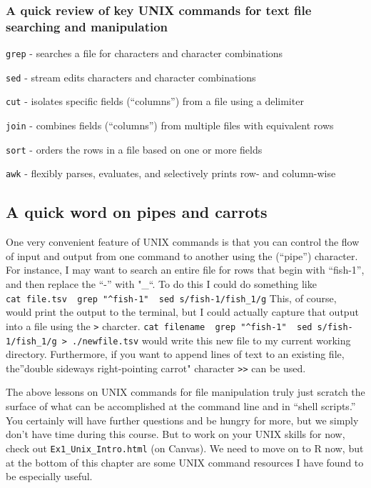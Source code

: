 \documentclass[]{book}
\begin{document}
\hypertarget{a-quick-review-of-key-unix-commands-for-text-file-searching-and-manipulation}{%
\subsubsection{A quick review of key UNIX commands for text file searching and manipulation}\label{a-quick-review-of-key-unix-commands-for-text-file-searching-and-manipulation}}

\texttt{grep} - searches a file for characters and character combinations

\texttt{sed} - stream edits characters and character combinations

\texttt{cut} - isolates specific fields (``columns'') from a file using a delimiter

\texttt{join} - combines fields (``columns'') from multiple files with equivalent rows

\texttt{sort} - orders the rows in a file based on one or more fields

\texttt{awk} - flexibly parses, evaluates, and selectively prints row- and column-wise

\hypertarget{a-quick-word-on-pipes-and-carrots}{%
\subsection{A quick word on pipes and carrots}\label{a-quick-word-on-pipes-and-carrots}}

One very convenient feature of UNIX commands is that you can control the flow of input and output from one command to another using the \texttt{\textbar{}} (``pipe'') character. For instance, I may want to search an entire file for rows that begin with ``fish-1'', and then replace the ``-'' with "\_``. To do this I could do something like \texttt{cat\ file.tsv\ \textbar{}\ grep\ "\^{}fish-1"\ \textbar{}\ sed\ \textquotesingle{}s/fish-1/fish\_1/g\textquotesingle{}} This, of course, would print the output to the terminal, but I could actually capture that output into a file using the \texttt{\textgreater{}} charcter. \texttt{cat\ filename\ \textbar{}\ grep\ "\^{}fish-1"\ \textbar{}\ sed\ \textquotesingle{}s/fish-1/fish\_1/g\textquotesingle{}\ \textgreater{}\ ./newfile.tsv} would write this new file to my current working directory. Furthermore, if you want to append lines of text to an existing file, the''double sideways right-pointing carrot" character \texttt{\textgreater{}\textgreater{}} can be used.

The above lessons on UNIX commands for file manipulation truly just scratch the surface of what can be accomplished at the command line and in ``shell scripts.'' You certainly will have further questions and be hungry for more, but we simply don't have time during this course. But to work on your UNIX skills for now, check out \texttt{Ex1\_Unix\_Intro.html} (on Canvas). We need to move on to R now, but at the bottom of this chapter are some UNIX command resources I have found to be especially useful.
\end{document}

